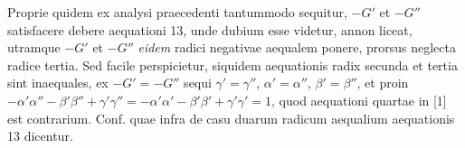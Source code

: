 \expandafter\def\csname HistoricalNoteText26\endcsname{Proprie quidem ex analysi praecedenti tantummodo sequitur, $-G'$ et $-G''$ satisfacere debere aequationi 13, unde dubium esse videtur, annon liceat, utramque $-G'$ et $-G''$ \textit{eidem} radici
negativae aequalem ponere, prorsus neglecta radice tertia. Sed facile perspicietur, siquidem aequationis radix secunda et tertia sint inaequales, ex $-G'=\allowbreak -G''$ sequi $\gamma'=\gamma''$, $\alpha'=\alpha''$, $\beta'=\beta''$, et proin
$-\alpha'\alpha''-\beta'\beta''+\allowbreak \gamma'\gamma''=\allowbreak -\alpha'\alpha'-\beta'\beta'+\allowbreak \gamma'\gamma'=1$, quod aequationi quartae in [1] est contrarium. Conf. quae
infra de casu duarum radicum aequalium aequationis 13 dicentur.}

